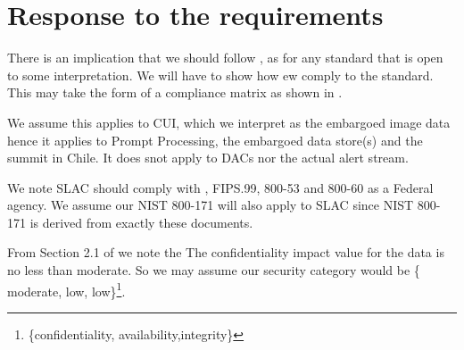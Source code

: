 \section{Response to the requirements}\label{sec:resp}

There is an implication that we should follow , as for any standard that is open to some interpretation.
We will have to show how ew comply to the standard.
This may take the form of a compliance matrix as shown in .

We assume this applies to CUI, which we interpret as the embargoed image data hence it applies to Prompt Processing, the embargoed data store(s) and the summit in Chile. It does snot apply to DACs nor the actual alert stream.

We note SLAC should comply with , FIPS.99, 800-53 and 800-60 as a Federal agency.
We assume our NIST 800-171  will also apply to SLAC since NIST 800-171 is derived from exactly these documents.

From Section 2.1 of  we note the The confidentiality impact value for the data  is no less than moderate.
So we may assume our  security category would be \{ moderate, low, low\}\footnote{\{confidentiality, availability,integrity\}}.









